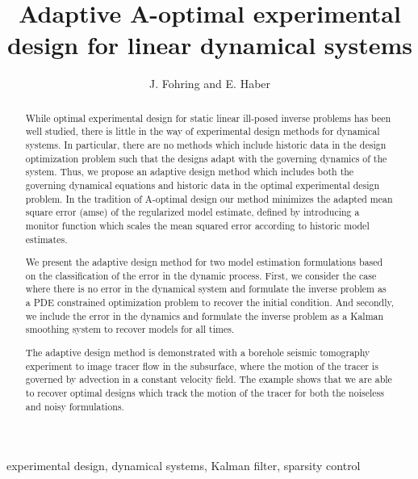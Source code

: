 \documentclass[leqno,onefignum,onetabnum]{siamltexmm}
\title{ Adaptive A-optimal experimental design for linear dynamical systems}
\author{J. Fohring and E. Haber }
\begin{document}
\maketitle
\newcommand{\slugmaster}{%
\slugger{juq}{2015}{xx}{x}{xx}}%





\begin{abstract}
While optimal experimental design for static linear ill-posed inverse problems has been well studied, there is little in the way of experimental design methods for dynamical systems. In particular, there are no methods which include historic data in the design optimization problem such that the designs adapt with the governing dynamics of the system. 
Thus, we propose an adaptive design method which includes both the governing dynamical equations and historic data in the optimal experimental design problem.
 In the tradition of  A-optimal design our method  minimizes the adapted mean square error (amse) of the regularized model estimate, defined by introducing a monitor function which scales the mean squared error according to historic model estimates. 

We present the adaptive design method for two model estimation formulations based on the classification of the error in the dynamic process. 
First, we consider the case where there is no error in the dynamical system and formulate the inverse problem as a PDE constrained optimization problem to recover the initial condition. 
And secondly, we include the error in the dynamics and formulate the inverse problem as a Kalman smoothing system to recover models for all times. 

The adaptive design method is demonstrated with a borehole seismic tomography experiment to image tracer flow in the subsurface, where the motion of the tracer is governed by  advection in a constant velocity field. The example shows that we are able to recover optimal designs which track the motion of the tracer for both the noiseless and noisy formulations. 
\end{abstract}


\begin{keywords}experimental design, dynamical systems, Kalman filter, sparsity control 
\end{keywords}

\begin{AMS}\end{AMS}
\end{document}
